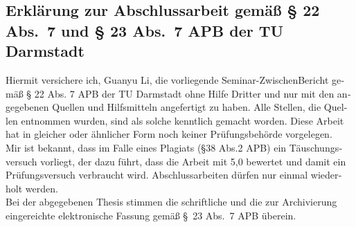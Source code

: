 \documentclass[11pt,longdoc,accentcolor=tud1b,paper=a4]{tuddesign/tudreport}
\title{\komTitle}
\newcommand{\komThesisType}{Seminar-ZwischenBericht\xspace}
\newcommand{\komName}{Guanyu Li\xspace}
\begin{document}
	
	\frenchspacing
	\raggedbottom
	\maketitle
	
	
    
    \begin{otherlanguage}{ngerman}
    
    \chapter*{Erklärung zur Abschlussarbeit gemäß § 22 Abs.\ 7 und § 23 Abs.\ 7 APB der TU Darmstadt}	 
    
    Hiermit versichere ich, \komName, die vorliegende \komThesisType gemäß § 22 Abs. 7 APB der TU Darmstadt ohne Hilfe Dritter und nur mit den angegebenen Quellen und Hilfsmitteln angefertigt zu haben.
    Alle Stellen, die Quellen entnommen wurden, sind als solche kenntlich gemacht worden. 
    Diese Arbeit hat in gleicher oder ähnlicher Form noch keiner Prüfungsbehörde vorgelegen. \\
   
	\noindent Mir ist bekannt, dass im Falle eines Plagiats (§38 Abs.2 APB) ein Täuschungsversuch vorliegt, der dazu führt, dass die Arbeit mit 5,0 bewertet und damit ein Prüfungsversuch verbraucht wird. 
	Abschlussarbeiten dürfen nur einmal wiederholt werden.\\

	\noindent Bei der abgegebenen Thesis stimmen die schriftliche und die zur Archivierung eingereichte elektronische Fassung gemäß §~23 Abs.~7 APB überein. \\

\end{otherlanguage}
\end{document}
